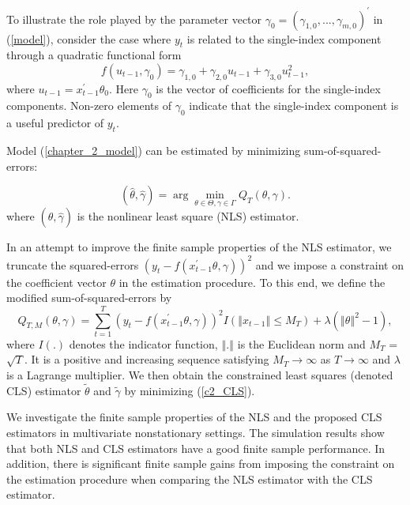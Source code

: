 \documentclass[a4paper,12pt,times,numbered,print,index]{report}
\numberwithin{equation}{section}
\begin{document}
	To illustrate the role played by the parameter vector $\gamma _{0}=\left( \gamma
	_{1,0},...,\gamma _{m,0}\right) ^{\prime }$ in (\ref{model}), consider the
	case where $y_{t}$ is related to the single-index component through a
	quadratic functional form%
	\[
	f\left( u_{t-1},\gamma _{0}\right) =\gamma _{1,0}+\gamma
	_{2,0}u_{t-1}+\gamma _{3,0}u_{t-1}^{2},
	\]%
	where $u_{t-1}=x_{t-1}^{\prime }\theta _{0}.$ Here $\gamma _{0}$ is the
	vector of coefficients for the single-index components. Non-zero elements of 
	$\gamma _{0}$ indicate that the single-index component is a useful predictor of $y_{t}$.
	
	Model (\ref{chapter_2_model}) can be estimated by minimizing sum-of-squared-errors:
	
	\begin{equation*}
		\left( \widehat{\theta},\widehat{\gamma}\right) =\arg \min_{\theta \in \Theta
			,\gamma \in \Gamma }Q_{T}\left( \theta ,\gamma \right) .  
	\end{equation*}%
	where $\left( \widehat{\theta},\widehat{\gamma}\right)$ is the nonlinear least square (NLS) estimator. 
	
	In an attempt to improve the finite sample properties of the NLS estimator, we truncate the squared-errors $\left( y_{t}-f\left(
	x_{t-1}^{\prime }\theta ,\gamma \right) \right) ^{2}$ and we impose a constraint on the coefficient vector $\theta $ in the estimation procedure. To this end, we define the modified sum-of-squared-errors by%
	\begin{equation}
		Q_{T,M}\left( \theta ,\gamma \right) =\sum_{t=1}^{T}\left( y_{t}-f\left(
		x_{t-1}^{\prime }\theta ,\gamma \right) \right) ^{2}I\left( \left\Vert
		x_{t-1}\right\Vert \leq M_{T}\right) +\lambda \left( \left\Vert \theta
		\right\Vert ^{2}-1\right) ,  
		\label{c2_CLS}
	\end{equation}%
	where $I\left( .\right) $ denotes the indicator function, $%
	\left\Vert .\right\Vert $ is the Euclidean norm and $M_T$ = $\sqrt{T}$. It is a positive and increasing sequence satisfying $ M_{T}\rightarrow \infty $ as $T \rightarrow \infty $ and $\lambda $ is a Lagrange
	multiplier. We then obtain the constrained least squares (denoted CLS) estimator $\tilde{\theta }$ and $\tilde{\gamma}$ by minimizing (\ref{c2_CLS}).
	
	We investigate the finite sample properties of the NLS and the proposed CLS estimators in multivariate nonstationary settings. The simulation results show that both NLS and CLS estimators have a good finite sample performance. In addition, there is significant finite sample gains from imposing the constraint on the estimation procedure when comparing the NLS estimator with the CLS estimator.
	
\end{document}
